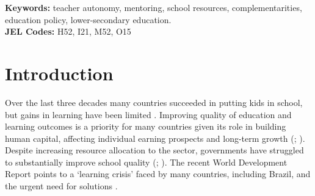\documentclass[11pt,a4paper]{article}
\begin{document}
\vspace{1.5em}
\begin{flushleft}
    \textbf{Keywords:}  teacher autonomy, mentoring, school resources, complementarities, education policy, lower-secondary education.  \\[1em]
    \textbf{JEL Codes:} H52, I21, M52, O15 \\
\end{flushleft}

\newpage
\sloppy

\doublespacing

\setlength\parskip{1em}
\setlength\parindent{0pt}



\section{Introduction} \label{intro}


Over the last three decades many countries succeeded in putting kids in school, but gains in learning have been limited \citep{WDR2018}. Improving quality of education and learning outcomes is a priority for many countries given its role in building human capital, affecting individual earning prospects and long-term growth (\citealp{hanushek2008role, hanushek2012better}; \citealp{chetty2014measuringII}). Despite increasing resource allocation to the sector, governments have struggled to substantially improve school quality (\citealp{mcewan2015improving}; \citealp{WDR2018}). The recent World Development Report points to a `learning crisis' faced by many countries, including Brazil, and the urgent need for solutions \citep{WDR2018}. 
\end{document}
